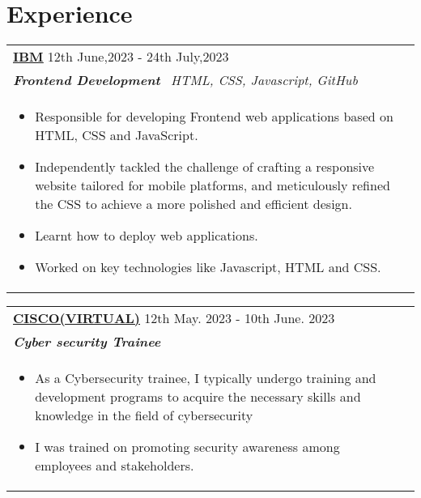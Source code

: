 \documentclass[a4paper,8pt]{article}
\begin{document}
\section{Experience}
\begin{tabularx}{\linewidth}{ @{}l r@{} }
\textbf{\uline{\href{https://akc2531.github.io/MyPortfolio/}{IBM}}} \hfill \color[HTML]{371e77} 12th June,2023  -  24th July,2023 \\[4pt]
\color[HTML]{371e77}\textbf{\textit{Frontend Development}}\ \hfill \color[HTML]{4B28A4} \textit{HTML, CSS, Javascript, GitHub} \\[5pt]
\begin{minipage}[t]{\linewidth}
    \begin{itemize}[nosep,after=\strut, leftmargin=2em, itemsep=2pt]
        \item Responsible for developing Frontend web applications based on HTML, CSS and JavaScript.
        \item Independently tackled the challenge of crafting a responsive 
  website tailored for mobile platforms, and meticulously refined the CSS to achieve a more polished and efficient design.
        \item Learnt how to deploy web applications.
        \item Worked on key technologies like Javascript, HTML and CSS.
    \end{itemize}
\end{minipage}
\end{tabularx}

\begin{tabularx}{\linewidth}{ @{}l r@{} }
\color[HTML]{1C033C} \textbf{\uline{{CISCO(VIRTUAL)}}} \hfill \color[HTML]{371e77} 12th May. 2023 - 10th June. 2023 \\[4pt]
\color[HTML]{371e77}\textbf{\textit{Cyber security Trainee}}\ \hfill \color[HTML]{4B28A4}  \\[5pt]
\begin{minipage}[t]{\linewidth}
    \begin{itemize}[nosep,after=\strut, leftmargin=2em, itemsep=2pt]
        \item As a Cybersecurity trainee, I typically undergo training and development programs to acquire the necessary skills and knowledge in the field of cybersecurity
        \item  I was trained on promoting security awareness among employees and stakeholders.
    \end{itemize}
\end{minipage}
\end{tabularx}
\end{document}
